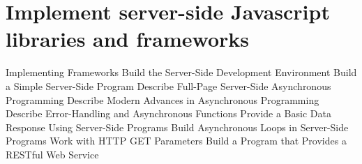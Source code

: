 \section {Implement server-side Javascript libraries and frameworks}
\begin{frame}{Implementing Frameworks}
	Build the Server-Side Development Environment
	Build a Simple Server-Side Program
	Describe Full-Page Server-Side Asynchronous Programming
	Describe Modern Advances in Asynchronous Programming
	Describe Error-Handling and Asynchronous Functions
	Provide a Basic Data Response Using Server-Side Programs
	Build Asynchronous Loops in Server-Side Programs
	Work with HTTP GET Parameters
	Build a Program that Provides a RESTful Web Service
\end{frame}		
